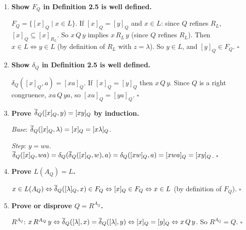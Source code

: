 \begin{enumerate}[{2.}1.]
\begin{enumerate}
\item The contrapositive of Theorem 2.3: ``if pumping fails then $L$ is not FAD.'' This is trivially true (it's logically equivalent to Theorem 2.3). But here pumping doesn't fail, so the contrapositive doesn't give us information. The converse (``if pumping holds then $L$ is FAD'') is \emph{false}, as this example shows.
\end{enumerate}

\item \textbf{Show $F_Q$ in Definition 2.5 is well defined.}

$F_Q=\{[x]_Q\mid x\in L\}$. If $[x]_Q=[y]_Q$ and $x\in L$: since $Q$ refines $R_L$, $[x]_Q\subseteq[x]_{R_L}$. So $x\,Q\,y$ implies $x\,R_L\,y$ (since $Q$ refines $R_L$). Then $x\in L\Leftrightarrow y\in L$ (by definition of $R_L$ with $z=\lambda$). So $y\in L$, and $[y]_Q\in F_Q$. $\square$

\item \textbf{Show $\delta_Q$ in Definition 2.5 is well defined.}

$\delta_Q([x]_Q,a)=[xa]_Q$. If $[x]_Q=[y]_Q$ then $x\,Q\,y$. Since $Q$ is a right congruence, $xa\,Q\,ya$, so $[xa]_Q=[ya]_Q$. $\square$

\item \textbf{Prove $\overline{\delta}_Q([x]_Q,y)=[xy]_Q$ by induction.}

\textit{Base}: $\overline{\delta}_Q([x]_Q,\lambda)=[x]_Q=[x\lambda]_Q$. \checkmark

\textit{Step}: $y=wa$. $\overline{\delta}_Q([x]_Q,wa)=\delta_Q(\overline{\delta}_Q([x]_Q,w),a)=\delta_Q([xw]_Q,a)=[xwa]_Q=[xy]_Q$. $\square$

\item \textbf{Prove $L(A_Q)=L$.}

$x\in L(A_Q)\Leftrightarrow\overline{\delta}_Q([\lambda]_Q,x)\in F_Q\Leftrightarrow[x]_Q\in F_Q\Leftrightarrow x\in L$ (by definition of $F_Q$). $\square$

\item \textbf{Prove or disprove $Q=R^{A_Q}$.}

$R^{A_Q}$: $x\,R^{A_Q}\,y\Leftrightarrow\overline{\delta}_Q([\lambda],x)=\overline{\delta}_Q([\lambda],y)\Leftrightarrow[x]_Q=[y]_Q\Leftrightarrow x\,Q\,y$. So $R^{A_Q}=Q$. $\square$


\end{enumerate}
